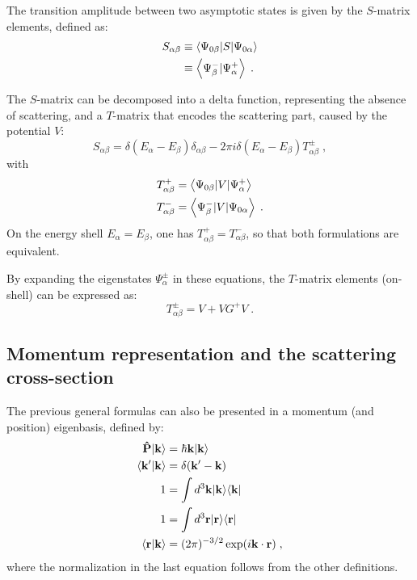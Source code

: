 The transition amplitude between two asymptotic states is given by the $S$-matrix elements, defined as:
\begin{align}
  S_{\alpha\beta} &\equiv \left\langle \Psi_{0\beta} \vert S \vert \Psi_{0\alpha} \right\rangle \nonumber\\
  & \equiv \left\langle \Psi_\beta^- \vert \Psi_\alpha^+ \right\rangle \; .
  \label{<++>}
\end{align}

The $S$-matrix can be decomposed into a delta function, representing the absence of scattering, and a $T$-matrix that encodes the scattering part, caused by the potential $V$:
\begin{equation*}
  S_{\alpha\beta} = \delta (E_\alpha - E_\beta)\delta_{\alpha\beta} - 2\pi i \delta (E_\alpha - E_\beta) T^\pm_{\alpha\beta} \; ,
\end{equation*}
with
\begin{align*}
  T^+_{\alpha\beta} & = \left\langle \Psi_{0\beta} \vert V \vert \Psi^+_\alpha \right\rangle \\
  T^-_{\alpha\beta} & = \left\langle \Psi^-_\beta \vert V \vert \Psi_{0\alpha} \right\rangle \; .
\end{align*}
On the energy shell $E_\alpha = E_\beta$, one has $T^+_{\alpha\beta}= T^-_{\alpha\beta}$, so that both formulations are equivalent.

By expanding the eigenstates $\Psi^\pm_\alpha$ in these equations, the $T$-matrix elements (on-shell) can be expressed as:
\begin{equation*}
  T^\pm_{\alpha\beta} = V + VG^+ V \; .
\end{equation*}


\subsection{Momentum representation and the scattering cross-section}

The previous general formulas can also be presented in a momentum (and position) eigenbasis, defined by:
\begin{align*}
  \mathbf{\hat{P}}\vert \mathbf{k} \rangle & = \hbar \mathbf{k} \vert \mathbf{k} \rangle \\
  \left\langle \mathbf{k'} \vert \mathbf{k} \right\rangle & = \delta(\mathbf{k'}-\mathbf{k}) \\
  1 &= \int d^3\mathbf{k} \vert \mathbf{k} \rangle \langle \mathbf{k} \vert \\
  1 &= \int d^3\mathbf{r} \vert \mathbf{r} \rangle \langle \mathbf{r} \vert \\
  \left\langle \mathbf{r} \vert \mathbf{k} \right\rangle &= (2\pi)^{-3/2} \exp (i\mathbf{k}\cdot\mathbf{r}) \; ,
\end{align*}
where the normalization in the last equation follows from the other definitions.

